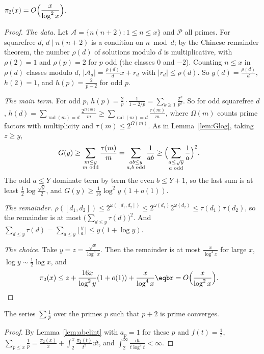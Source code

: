 \begin{theorem}[Brun, 1919]\label{thm:twins}
$\pi_2(x)=O\Bigl(\dfrac x{\log^2x}\Bigr)$.
\end{theorem}
\begin{proof}
\emph{The data.} Let $\mathcal A=\{n(n+2):1\le n\le x\}$ and $\mathcal P$ all primes. For squarefree $d$, $d\mid n(n+2)$ is a condition on $n\bmod d$; by the Chinese remainder theorem, the number $\rho(d)$ of solutions modulo
$d$ is multiplicative, with $\rho(2)=1$ and $\rho(p)=2$ for $p$ odd (the classes $0$ and $-2$). Counting $n\le x$ in $\rho(d)$ classes modulo $d$, $|\mathcal A_d|=\frac{\rho(d)}dx+r_d$ with $|r_d|\le\rho(d)$. So
$g(d)=\frac{\rho(d)}d$, $h(2)=1$, and $h(p)=\frac{2}{p-2}$ for odd $p$.

\emph{The main term.} For odd $p$, $h(p)=\frac2p\cdot\frac1{1-2/p}=\sum_{k\ge1}\frac{2^k}{p^k}$. So for odd squarefree $d$, $h(d)=\sum_{\operatorname{rad}(m)=d}\frac{2^{\Omega(m)}}m\ge\sum_{\operatorname{rad}(m)=d}\frac{\tau(m)}m$, where
$\Omega(m)$ counts prime factors with multiplicity and $\tau(m)\le2^{\Omega(m)}$. As in Lemma~\ref{lem:Glog}, taking $z\ge y$,
\[
\begin{aligned}G(y)&\ge\sum_{\substack{m\le y\\m\text{ odd}}}\frac{\tau(m)}m=\sum_{\substack{ab\le y\\a,b\text{ odd}}}\frac1{ab}\ge\Bigl(\sum_{\substack{a\le\sqrt y\\a\text{ odd}}}\frac1a\Bigr)^2.\end{aligned}
\]
The odd $a\le Y$ dominate term by term the even $b\le Y+1$, so the last sum is at least $\frac12\log\frac{\sqrt y}2$, and $G(y)\ge\frac1{16}\log^2y\,(1+o(1))$.

\emph{The remainder.} $\rho([d_1,d_2])\le2^{\omega([d_1,d_2])}\le2^{\omega(d_1)}2^{\omega(d_2)}\le\tau(d_1)\tau(d_2)$, so the remainder is at most $\bigl(\sum_{d\le y}\tau(d)\bigr)^2$. And $\sum_{d\le y}\tau(d)=\sum_{a\le y}\lfloor\frac ya\rfloor\le y(1+\log y)$.

\emph{The choice.} Take $y=z=\frac{\sqrt x}{\log^3x}$. Then the remainder is at most $\frac x{\log^4x}$ for large $x$, $\log y\sim\frac12\log x$, and
\[
\begin{aligned}\pi_2(x)&\le z+\frac{16x}{\log^2y}(1+o(1))+\frac x{\log^4x}\eqbr=O\Bigl(\frac x{\log^2x}\Bigr).\end{aligned}
\]
\end{proof}

\begin{corollary}[Brun, 1919]\label{cor:brun}
The series $\sum\frac1p$ over the primes $p$ such that $p+2$ is prime converges.
\end{corollary}
\begin{proof}
By Lemma~\ref{lem:abelint} with $a_p=1$ for these $p$ and $f(t)=\frac1t$, $\sum_{p\le x}\frac1p=\frac{\pi_2(x)}x+\int_2^x\frac{\pi_2(t)}{t^2}\dd t$, and $\int_2^\infty\frac{\mathrm dt}{t\log^2t}<\infty$.
\end{proof}

